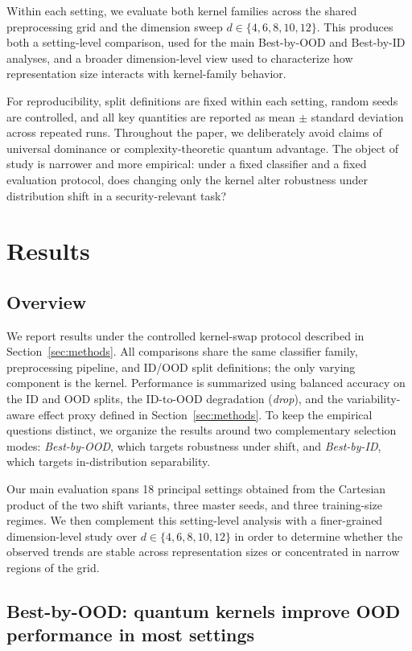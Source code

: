 \documentclass[pdflatex,sn-mathphys-num]{sn-jnl}%
\theoremstyle{thmstyleone}%
\theoremstyle{thmstyletwo}%
\theoremstyle{thmstylethree}%
\begin{document}
Within each setting, we evaluate both kernel families across the shared preprocessing grid and the dimension sweep $d \in \{4,6,8,10,12\}$. This produces both a setting-level comparison, used for the main Best-by-OOD and Best-by-ID analyses, and a broader dimension-level view used to characterize how representation size interacts with kernel-family behavior.

For reproducibility, split definitions are fixed within each setting, random seeds are controlled, and all key quantities are reported as mean $\pm$ standard deviation across repeated runs. Throughout the paper, we deliberately avoid claims of universal dominance or complexity-theoretic quantum advantage. The object of study is narrower and more empirical: under a fixed classifier and a fixed evaluation protocol, does changing only the kernel alter robustness under distribution shift in a security-relevant task?

\section{Results}
\label{sec:results}

\subsection{Overview}

We report results under the controlled kernel-swap protocol described in Section~\ref{sec:methods}. All comparisons share the same classifier family, preprocessing pipeline, and ID/OOD split definitions; the only varying component is the kernel. Performance is summarized using balanced accuracy on the ID and OOD splits, the ID-to-OOD degradation (\emph{drop}), and the variability-aware effect proxy defined in Section~\ref{sec:methods}. To keep the empirical questions distinct, we organize the results around two complementary selection modes: \emph{Best-by-OOD}, which targets robustness under shift, and \emph{Best-by-ID}, which targets in-distribution separability.

Our main evaluation spans 18 principal settings obtained from the Cartesian product of the two shift variants, three master seeds, and three training-size regimes. We then complement this setting-level analysis with a finer-grained dimension-level study over $d \in \{4,6,8,10,12\}$ in order to determine whether the observed trends are stable across representation sizes or concentrated in narrow regions of the grid.

\subsection{Best-by-OOD: quantum kernels improve OOD performance in most settings}
\end{document}
